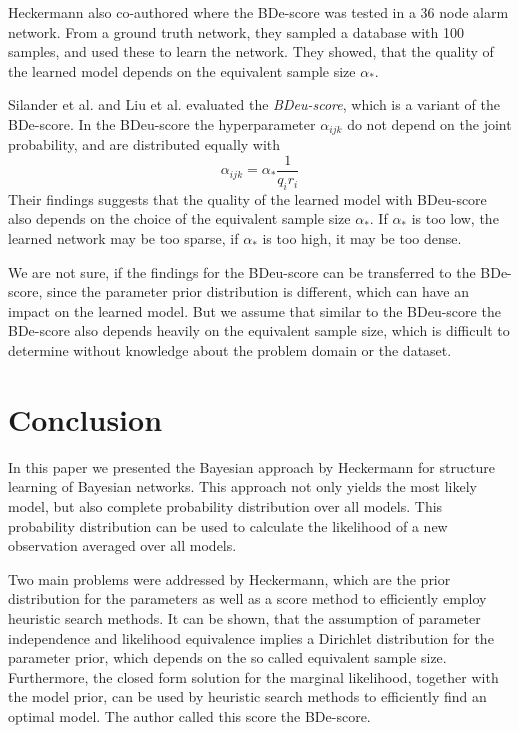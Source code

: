 \documentclass{article}
\begin{document}
Heckermann also co-authored \cite{prior_network} where the BDe-score was tested in a 36 node alarm network.
From a ground truth network, they sampled a database with 100 samples, and used these to learn
the network. They showed, that the quality of the learned model depends on the equivalent
sample size $\alpha_*$.

Silander et al.  and Liu et al.  evaluated the \textit{BDeu-score}, which is a variant
of the BDe-score. In the BDeu-score the hyperparameter $\alpha_{ijk}$ do not depend on the joint
probability, and are distributed equally with
\[
	\alpha_{ijk} = \alpha_*\frac{1}{q_ir_i}
\]
Their findings suggests that the quality of the learned model with BDeu-score also depends on 
the choice of the equivalent sample size $\alpha_*$. If $\alpha_*$ is too low, the learned network
may be too sparse, if $\alpha_*$ is too high, it may be too dense.

We are not sure, if the findings
for the BDeu-score can be transferred to the BDe-score, since the parameter prior distribution is
different, which can have an impact on the learned model. But we assume that similar to the BDeu-score
the BDe-score also depends heavily on the equivalent sample size, which is difficult to determine
without knowledge about the problem domain or the dataset. 

\section{Conclusion}
In this paper we presented the Bayesian approach by Heckermann \cite{original} for structure learning of
Bayesian networks. This approach not only yields the most likely model, but also complete
probability distribution over all models. This probability distribution can be used to calculate
the likelihood of a new observation averaged over all models.

Two main problems were addressed by Heckermann, which are the prior distribution for the parameters
as well as a score method to efficiently employ heuristic search methods. It can be shown, that
the assumption of parameter independence and likelihood equivalence implies a Dirichlet distribution
for the parameter prior, which depends on the so called equivalent sample size. Furthermore, the closed
form solution for the marginal likelihood, together with the model prior, can be used by heuristic
search methods to efficiently find an optimal model. The author called this score the BDe-score.
\end{document}
